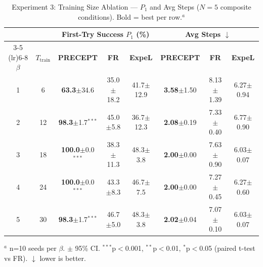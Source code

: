 \begin{table}[t]
\centering
\caption{Experiment 3: Training Size Ablation --- $P_1$ and Avg Steps ($N{=}5$ composite conditions). Bold = best per row.$^a$}
\label{tab:exp3_training_size}
\begin{tabular}{cc ccc ccc}
\toprule
& & \multicolumn{3}{c}{\textbf{First-Try Success $P_1$ (\%)}} & \multicolumn{3}{c}{\textbf{Avg Steps} $\downarrow$} \\
\cmidrule(lr){3-5} \cmidrule(lr){6-8}
$\beta$ & $T_{\text{train}}$ & \textbf{PRECEPT} & \textbf{FR} & \textbf{ExpeL} & \textbf{PRECEPT} & \textbf{FR} & \textbf{ExpeL} \\
\midrule
1 & 6 & \textbf{63.3}$\pm$34.6 & 35.0$\pm$18.2 & 41.7$\pm$12.9 & \textbf{3.58}$\pm$1.50 & 8.13$\pm$1.39 & 6.27$\pm$0.94 \\
2 & 12 & \textbf{98.3}$\pm$1.7$^{***}$ & 45.0$\pm$5.8 & 36.7$\pm$12.3 & \textbf{2.08}$\pm$0.19 & 7.33$\pm$0.40 & 6.77$\pm$0.90 \\
3 & 18 & \textbf{100.0}$\pm$0.0$^{***}$ & 38.3$\pm$11.3 & 48.3$\pm$3.8 & \textbf{2.00}$\pm$0.00 & 7.63$\pm$0.90 & 6.03$\pm$0.07 \\
4 & 24 & \textbf{100.0}$\pm$0.0$^{***}$ & 43.3$\pm$8.3 & 46.7$\pm$7.5 & \textbf{2.00}$\pm$0.00 & 7.27$\pm$0.45 & 6.27$\pm$0.60 \\
5 & 30 & \textbf{98.3}$\pm$1.7$^{***}$ & 46.7$\pm$5.0 & 48.3$\pm$3.8 & \textbf{2.02}$\pm$0.04 & 7.07$\pm$0.10 & 6.03$\pm$0.07 \\
\bottomrule
\end{tabular}
\vspace{2mm}
\footnotesize
$^a$ n=10 seeds per $\beta$. $\pm$ 95\% CI. $^{***}$p$<$0.001, $^{**}$p$<$0.01, $^{*}$p$<$0.05 (paired t-test vs FR). $\downarrow$ lower is better.
\end{table}
